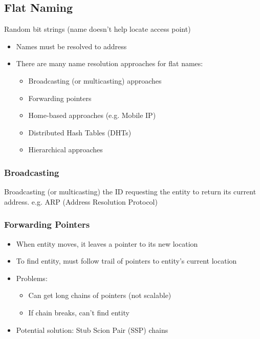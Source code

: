 \subsection{Flat Naming}
Random bit strings (name doesn't help locate access point)
\begin{itemize}
	\item Names must be resolved to address
	\item There are many name resolution approaches for flat names:
	\begin{itemize}
		\item Broadcasting (or multicasting) approaches
		\item Forwarding pointers
		\item Home-based approaches (e.g. Mobile IP)
		\item Distributed Hash Tables (DHTs)
		\item Hierarchical approaches
	\end{itemize}
\end{itemize}

\subsubsection{Broadcasting}
Broadcasting (or multicasting) the ID requesting the entity to return its current address. e.g. ARP (Address Resolution Protocol)

\subsubsection{Forwarding Pointers}
\begin{itemize}
	\item When entity moves, it leaves a pointer to its new location
	\item To find entity, must follow trail of pointers to entity's current location
	\item Problems:
	\begin{itemize}
		\item Can get long chains of pointers (not scalable)
		\item If chain breaks, can't find entity
	\end{itemize}
	\item Potential solution:
	\subitem Stub Scion Pair (SSP) chains	
\end{itemize}

